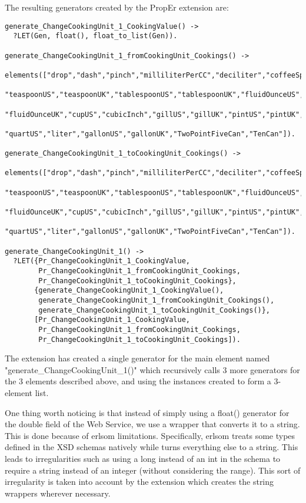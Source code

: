 \documentclass[submission,copyright,a4]{eptcs}
\begin{document}
The resulting generators created by the PropEr extension are:

\begin{lstlisting}
generate_ChangeCookingUnit_1_CookingValue() ->
  ?LET(Gen, float(), float_to_list(Gen)).

generate_ChangeCookingUnit_1_fromCookingUnit_Cookings() ->
  elements(["drop","dash","pinch","milliliterPerCC","deciliter","coffeeSpoon","fluidDram",
             "teaspoonUS","teaspoonUK","tablespoonUS","tablespoonUK","fluidOunceUS",
             "fluidOunceUK","cupUS","cubicInch","gillUS","gillUK","pintUS","pintUK",
             "quartUS","liter","gallonUS","gallonUK","TwoPointFiveCan","TenCan"]).

generate_ChangeCookingUnit_1_toCookingUnit_Cookings() ->
  elements(["drop","dash","pinch","milliliterPerCC","deciliter","coffeeSpoon","fluidDram",
             "teaspoonUS","teaspoonUK","tablespoonUS","tablespoonUK","fluidOunceUS",
             "fluidOunceUK","cupUS","cubicInch","gillUS","gillUK","pintUS","pintUK",
             "quartUS","liter","gallonUS","gallonUK","TwoPointFiveCan","TenCan"]).

generate_ChangeCookingUnit_1() ->
  ?LET({Pr_ChangeCookingUnit_1_CookingValue,
        Pr_ChangeCookingUnit_1_fromCookingUnit_Cookings,
        Pr_ChangeCookingUnit_1_toCookingUnit_Cookings},
       {generate_ChangeCookingUnit_1_CookingValue(),    
        generate_ChangeCookingUnit_1_fromCookingUnit_Cookings(),
        generate_ChangeCookingUnit_1_toCookingUnit_Cookings()},
       [Pr_ChangeCookingUnit_1_CookingValue,
        Pr_ChangeCookingUnit_1_fromCookingUnit_Cookings, 
        Pr_ChangeCookingUnit_1_toCookingUnit_Cookings]).
\end{lstlisting}

The extension has created a single generator for the main element named "generate\_ChangeCookingUnit\_1()" which recursively calls 3 more generators for the 3 elements described above, and using the instances created to form a 3-element list. 

One thing worth noticing is that instead of simply using a float() generator for the double field of the Web Service, we use a wrapper that converts it to a string. This is done because of erlsom limitations. Specifically, erlsom treats some types defined in the XSD schemas natively while turns everything else to a string. This leads to irregularities such as using a long instead of an int in the schema to require a string instead of an integer (without considering the range). This sort of irregularity is taken into account by the extension which creates the string wrappers wherever necessary.
\end{document}
